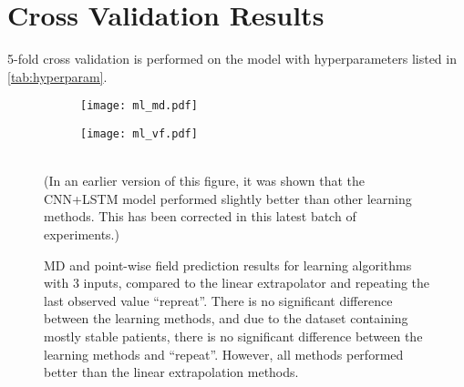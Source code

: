 \section{Cross Validation Results}

5-fold cross validation is performed on the model with hyperparameters listed in \cref{tab:hyperparam}. 

\begin{figure}[p]
	\centering
	\begin{subfigure}[b]{\textwidth}
		\centering
		\texttt{[image: ml\_md.pdf]}
		\caption{}
	\end{subfigure}
	\hfill
	\begin{subfigure}[b]{\textwidth}
		\centering
		\texttt{[image: ml\_vf.pdf]}
		\caption{}
	\end{subfigure}
	\caption[\acs{MD} and point-wise field prediction results for learning algorithms]{\acs{MD} and point-wise field prediction results for learning algorithms with 3 inputs, compared to the linear extrapolator and repeating the last observed value ``repreat''. There is no significant difference between the learning methods, and due to the dataset containing mostly stable patients, there is no significant difference between the learning methods and ``repeat''. However, all methods performed better than the linear extrapolation methods. }
	\hfill\\
	(In an earlier version of this figure, it was shown that the CNN+LSTM model performed slightly better than other learning methods. This has been corrected in this latest batch of experiments.)
	\label{fig:ml_fig}
\end{figure}

